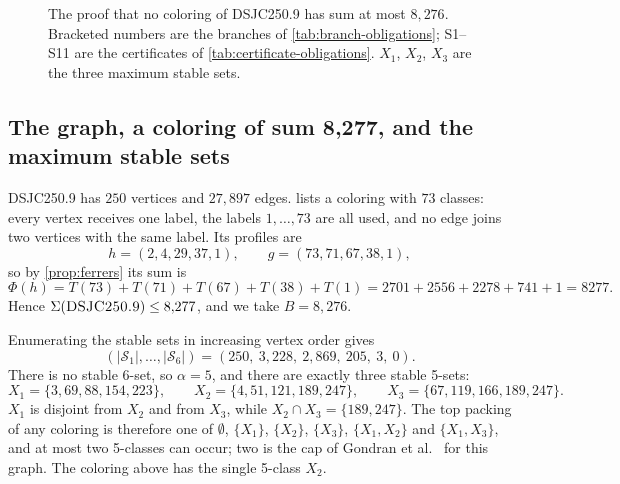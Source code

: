 \documentclass[11pt]{article}
\theoremstyle{definition}
\newcommand{\DSJCTwoFifty}{\textnormal{\textsc{DSJC250.9}}}
\newcommand{\Stable}{\mathcal{S}}
\begin{document}
\begin{figure}[tbp]
\caption{The proof that no coloring of \DSJCTwoFifty{} has sum at most
$8{,}276$. Bracketed numbers are the branches of \cref{tab:branch-obligations};
S1--S11 are the certificates of \cref{tab:certificate-obligations}. $X_1$,
$X_2$, $X_3$ are the three maximum stable sets.}
\label{fig:dsjc250-tree}
\end{figure}

\subsection{The graph, a coloring of sum 8,277, and the maximum stable sets}
\label{sec:dsjc250-graph}

\DSJCTwoFifty{} has $250$ vertices and $27{,}897$ edges. 
lists a coloring with $73$ classes: every vertex receives one label, the
labels $1,\ldots,73$ are all used, and no edge joins two vertices with the
same label. Its profiles are
\begin{equation}
\label{eq:incumbent-profile}
  h=(2,4,29,37,1),\qquad g=(73,71,67,38,1),
\end{equation}
so by \cref{prop:ferrers} its sum is
\begin{equation}
\label{eq:incumbent-sum}
  \Phi(h)=T(73)+T(71)+T(67)+T(38)+T(1)=2701+2556+2278+741+1=8277.
\end{equation}
Hence $\Sigma(\DSJCTwoFifty)\le8{,}277$, and we take $B=8{,}276$.

Enumerating the stable sets in increasing vertex order gives
\[
 (|\Stable_1|,\ldots,|\Stable_6|)=(250,\ 3{,}228,\ 2{,}869,\ 205,\ 3,\ 0).
\]
There is no stable 6-set, so $\alpha=5$, and there are exactly three stable
5-sets:
\[
  X_1=\{3,69,88,154,223\},\qquad
  X_2=\{4,51,121,189,247\},\qquad
  X_3=\{67,119,166,189,247\}.
\]
$X_1$ is disjoint from $X_2$ and from $X_3$, while $X_2\cap X_3=\{189,247\}$.
The top packing of any coloring is therefore one of $\emptyset$, $\{X_1\}$,
$\{X_2\}$, $\{X_3\}$, $\{X_1,X_2\}$ and $\{X_1,X_3\}$, and at most two
5-classes can occur; two is the cap of Gondran et al.~\cite{gondran2019} for
this graph. The coloring above has the single 5-class $X_2$.
\end{document}
